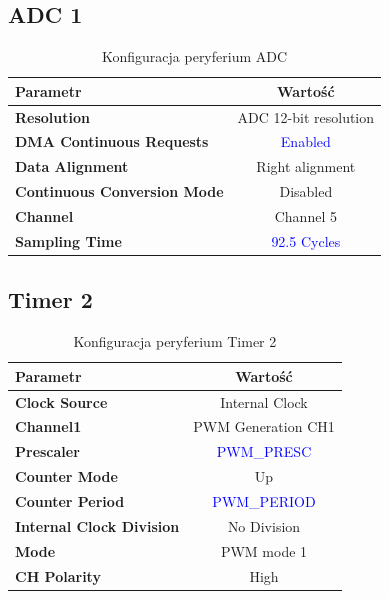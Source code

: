 \documentclass[10pt, a4paper]{article}
\begin{document}
\subsection{ADC 1}

\begin{table}[H]
	\centering
	\begin{tabular}{|l|c|} \hline
		\textbf{Parametr} & Wartość \\
		\hline
		\hline  \textbf{Resolution}&ADC 12-bit resolution  \\\hline
		\textbf{DMA Continuous Requests} & \textcolor{blue}{Enabled}\\\hline
		\textbf{Data Alignment} &  Right alignment\\
		\hline
		\textbf{Continuous Conversion Mode}& Disabled\\
		\hline
		\textbf{Channel}& Channel 5\\
		\hline
		\textbf{Sampling Time}& \textcolor{blue}{92.5 Cycles}\\
		\hline
	\end{tabular}
	\caption{Konfiguracja peryferium ADC}
	\label{tab:ADC}
\end{table}

\subsection{Timer 2}

\begin{table}[H]
	\centering
	\begin{tabular}{|l|c|} \hline
		\textbf{Parametr} & Wartość \\
		\hline
		\hline  \textbf{Clock Source}&Internal Clock  \\\hline
		\textbf{Channel1} & PWM Generation CH1\\\hline
		\textbf{Prescaler} & \textcolor{blue}{PWM\_PRESC}\\\hline
		\textbf{Counter Mode} &  Up\\
		\hline
		\textbf{Counter Period}& \textcolor{blue}{PWM\_PERIOD}\\\hline
		\textbf{Internal Clock Division}& No Division\\
		\hline
		\textbf{Mode}& PWM mode 1\\
		\hline
		\textbf{CH Polarity}& High\\
		\hline
	\end{tabular}
	\caption{Konfiguracja peryferium Timer 2}
	\label{tab:Timer2}
\end{table}
\end{document}
